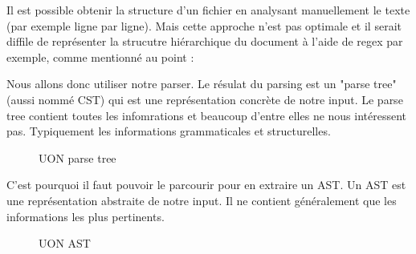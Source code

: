 \documentclass[
    iict, %
    il, %
]{heig-tb}
\begin{document}
Il est possible obtenir la structure d'un fichier en analysant manuellement le texte (par exemple ligne par ligne).
Mais cette approche n'est pas optimale et il serait diffile de représenter la strucutre hiérarchique du document à l'aide de regex par exemple,
comme mentionné au point : %

Nous allons donc utiliser notre parser.
Le résulat du parsing est un "parse tree" (aussi nommé CST) qui est une représentation concrète de notre input. Le parse tree contient toutes les infomrations et beaucoup d'entre elles ne nous intéressent pas.
Typiquement les informations grammaticales et structurelles.

\begin{figure}[!h]
    \begin{center}
    \end{center}
    \caption[UON parse tree]{\label{parse-tree} UON parse tree}
\end{figure}

C'est pourquoi il faut pouvoir le parcourir pour en extraire un AST.
Un AST est une représentation abstraite de notre input. Il ne contient généralement que les informations les plus pertinents.

\begin{figure}[!h]
    \begin{center}
    \end{center}
    \caption[UON AST]{\label{ast} UON AST}
\end{figure}
\end{document}
